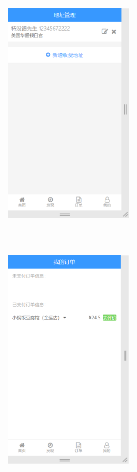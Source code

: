 \begin{figure}[H]
{\begin{minipage}[t]{0.22\linewidth}
            \includegraphics[width=3.2cm,height=6.4cm]{figures/3.1.6.png}\\
            \includegraphics[width=3.2cm,height=6.4cm]{figures/3.1.11.png}\\
        \end{minipage}
    }
\end{figure}
